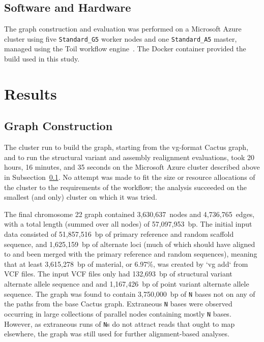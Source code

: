 \subsection{Software and Hardware}
\label{subsec:azurecluster}

\begin{sloppypar}
The graph construction and evaluation was performed on a Microsoft Azure cluster using five \texttt{Standard\_G5} worker nodes and one \texttt{Standard\_A5} master, managed using the Toil workflow engine~\cite{vivian2017toil}. The  Docker container provided the \vg build used in this study.
\end{sloppypar}


\section{Results}

\subsection{Graph Construction}

The cluster run to build the graph, starting from the vg-format Cactus graph, and to run the structural variant and assembly realignment evaluations, took 20 hours, 16 minutes, and 35 seconds on the Microsoft Azure cluster described above in Subsection~\ref{subsec:azurecluster}. No attempt was made to fit the size or resource allocations of the cluster to the requirements of the workflow; the analysis succeeded on the smallest (and only) cluster on which it was tried.

The final chromosome 22 graph contained 3,630,637~nodes and 4,736,765~edges, with a total length (summed over all nodes) of 57,097,953~bp. The initial input data consisted of 51,857,516~bp of primary reference and random scaffold sequence, and 1,625,159~bp of alternate loci (much of which should have aligned to and been merged with the primary reference and random sequences), meaning that at least 3,615,278~bp of material, or 6.97\%, was created by `vg add` from VCF files. The input VCF files only had 132,693~bp of structural variant alternate allele sequence and and 1,167,426~bp of point variant alternate allele sequence. The graph was found to contain 3,750,000~bp of \texttt{N} bases not on any of the paths from the base Cactus graph. Extraneous \texttt{N} bases were observed occurring in large collections of parallel nodes containing mostly \texttt{N} bases. However, as extraneous runs of \texttt{N}s do not attract reads that ought to map elsewhere, the graph was still used for further alignment-based analyses.

